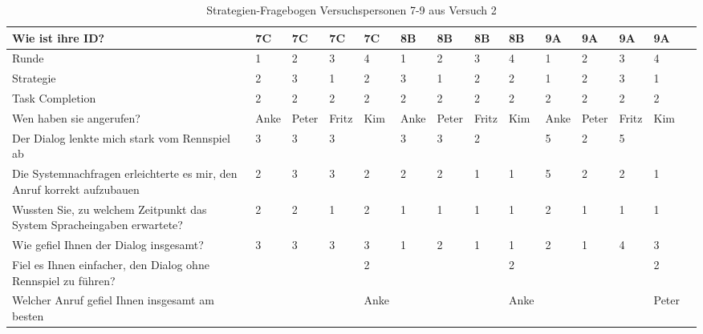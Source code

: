 \documentclass[12pt,a4paper]{scrartcl}
\begin{document}
\begin{appendix}
\begin{table}
\caption{Strategien-Fragebogen Versuchspersonen 7-9 aus Versuch 2}
\begin{tabular}{|p{6cm}| p{0.8cm} | p{0.8cm} | p{0.8cm} | p{0.8cm} || p{0.8cm} | p{0.8cm} | p{0.8cm} | p{0.8cm} || p{0.8cm} | p{0.8cm} | p{0.8cm} | p{0.8cm} | p{} | }
\hline
	Wie ist ihre ID? & 7C & 7C & 7C & 7C & 8B & 8B & 8B & 8B & 9A & 9A & 9A & 9A \\ \hline \hline
	Runde & 1 & 2 & 3 & 4 & 1 & 2 & 3 & 4 & 1 & 2 & 3 & 4 \\ \hline
	Strategie & 2 & 3 & 1 & 2 & 3 & 1 & 2 & 2 & 1 & 2 & 3 & 1 \\ \hline \hline
	Task Completion & 2 & 2 & 2 & 2 & 2 & 2 & 2 & 2 & 2 & 2 & 2 & 2 \\ \hline \hline
	Wen haben sie angerufen? & Anke & Peter & Fritz & Kim & Anke & Peter & Fritz & Kim & Anke & Peter & Fritz & Kim \\ \hline
	Der Dialog lenkte mich stark vom Rennspiel ab & 3 & 3 & 3 &  & 3 & 3 & 2 &  & 5 & 2 & 5 &  \\ \hline
	Die Systemnachfragen erleichterte es mir, den Anruf korrekt aufzubauen & 2 & 3 & 3 & 2 & 2 & 2 & 1 & 1 & 5 & 2 & 2 & 1 \\ \hline
	Wussten Sie, zu welchem Zeitpunkt das System Spracheingaben erwartete? & 2 & 2 & 1 & 2 & 1 & 1 & 1 & 1 & 2 & 1 & 1 & 1 \\ \hline
	Wie gefiel Ihnen der Dialog insgesamt? & 3 & 3 & 3 & 3 & 1 & 2 & 1 & 1 & 2 & 1 & 4 & 3 \\ \hline
	Fiel es Ihnen einfacher, den Dialog ohne Rennspiel zu führen? &  &  &  & 2 &  &  &  & 2 &  &  &  & 2 \\ \hline
	Welcher Anruf gefiel Ihnen insgesamt am besten &  &  &  & Anke &  &  &  & Anke &  &  &  & Peter  \\ \hline
\end{tabular}
\end{table}


\end{appendix}
\end{document}
